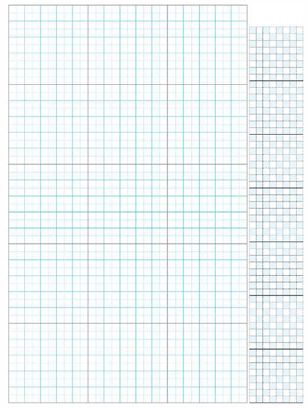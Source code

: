 \documentclass[titlepage, a4paper]{article}
\begin{document}
	\newpage
	\includegraphics{src/Miscellany/Grid_Paper.pdf}
	
	\begin{multicols}{2}
		\begin{spacing}{0.6}
		\begin{small}
	
		\end{small}
	\end{spacing}
	\end{multicols}
	
\end{document}
